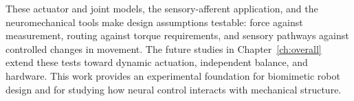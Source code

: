 These actuator and joint models, the sensory-afferent application, and the neuromechanical tools make design assumptions testable: force against measurement, routing against torque requirements, and sensory pathways against controlled changes in movement. The future studies in Chapter~\ref{ch:overall} extend these tests toward dynamic actuation, independent balance, and hardware. This work provides an experimental foundation for biomimetic robot design and for studying how neural control interacts with mechanical structure.
